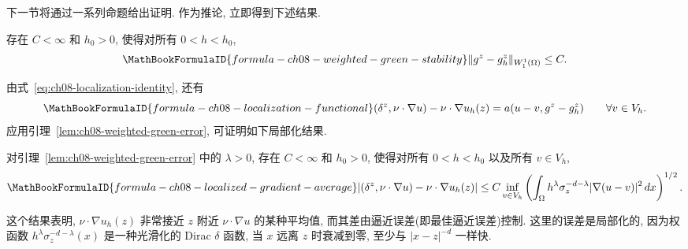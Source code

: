 下一节将通过一系列命题给出证明. 作为推论, 立即得到下述结果.

\begin{Corollary}
\label{cor:ch08-weighted-green-stability}
存在 $C<\infty$ 和 $h_0>0$, 使得对所有 $0<h<h_0$,
\[
\MathBookFormulaID{formula-ch08-weighted-green-stability}
\|g^z-g_h^z\|_{W_1^1(\Omega)}\leq C.
\]
\end{Corollary}

由式~\eqref{eq:ch08-localization-identity}, 还有
\[
\MathBookFormulaID{formula-ch08-localization-functional}
(\delta^z,\nu\cdot\nabla u)-\nu\cdot\nabla u_h(z)=a(u-v,g^z-g_h^z)
\qquad\forall v\in V_h.
\]
应用引理~\ref{lem:ch08-weighted-green-error}, 可证明如下局部化结果.

\begin{Corollary}
\label{cor:ch08-localized-gradient-average}
对引理~\ref{lem:ch08-weighted-green-error} 中的 $\lambda>0$, 存在 $C<\infty$ 和 $h_0>0$, 使得对所有 $0<h<h_0$ 以及所有 $v\in V_h$,
\[
\MathBookFormulaID{formula-ch08-localized-gradient-average}
|(\delta^z,\nu\cdot\nabla u)-\nu\cdot\nabla u_h(z)|
\leq C\inf_{v\in V_h}
\left(\int_\Omega h^\lambda\sigma_z^{-d-\lambda}|\nabla(u-v)|^2\,dx\right)^{1/2}.
\]
\end{Corollary}

这个结果表明, $\nu\cdot\nabla u_h(z)$ 非常接近 $z$ 附近 $\nu\cdot\nabla u$ 的某种平均值, 而其差由逼近误差(即最佳逼近误差)控制. 这里的误差是局部化的, 因为权函数 $h^\lambda\sigma_z^{-d-\lambda}(x)$ 是一种光滑化的 Dirac $\delta$ 函数, 当 $x$ 远离 $z$ 时衰减到零, 至少与 $|x-z|^{-d}$ 一样快.
